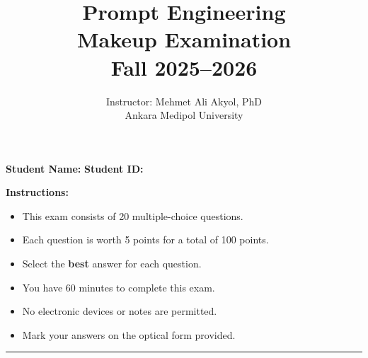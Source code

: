 \documentclass[11pt]{article}
\title{\textbf{Prompt Engineering}\\\large Makeup Examination\\Fall 2025--2026}
\author{Instructor: Mehmet Ali Akyol, PhD\\Ankara Medipol University}
\date{}
\begin{document}
\maketitle

\noindent\textbf{Student Name:} \underline{\hspace{6cm}} \hfill \textbf{Student ID:} \underline{\hspace{4cm}}

\vspace{0.5cm}
\noindent\textbf{Instructions:}
\begin{itemize}[noitemsep]
    \item This exam consists of 20 multiple-choice questions.
    \item Each question is worth 5 points for a total of 100 points.
    \item Select the \textbf{best} answer for each question.
    \item You have 60 minutes to complete this exam.
    \item No electronic devices or notes are permitted.
    \item Mark your answers on the optical form provided.
\end{itemize}

\vspace{0.5cm}
\hrule
\vspace{0.5cm}
\end{document}

